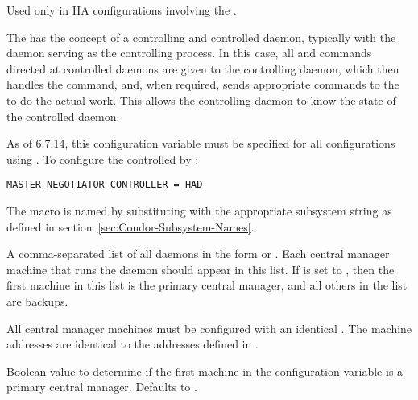 \begin{description}
\label{param:MasterSubsysController}
\item[\Macro{MASTER\_<SUBSYS>\_CONTROLLER}]
  Used only in HA configurations involving the .

  The  has the concept of a controlling and controlled
  daemon, typically
  with the  daemon serving as the controlling process.
  In this case, all  and  commands directed
  at controlled daemons are given to the controlling daemon, which
  then handles the command, and, when required, sends appropriate
  commands to the  to do the actual work.  This allows
  the controlling daemon to know the state of the controlled daemon.

  As of 6.7.14, this configuration variable must be specified for all
  configurations using .
  To configure the  controlled by :

\begin{verbatim}
MASTER_NEGOTIATOR_CONTROLLER = HAD
\end{verbatim}

  The macro is named by substituting 
  with the appropriate subsystem string as defined in
  section~\ref{sec:Condor-Subsystem-Names}.


\label{param:HADList}
\item[\Macro{HAD\_LIST}]
  A comma-separated list of all  daemons
  in the form  or .
  Each central manager machine that runs the  daemon
  should appear in this list.
  If  is set to ,
  then the first machine in this list is the primary central
  manager, and all others in the list are backups.

  All central manager machines must be configured with 
  an identical .
  The machine addresses are identical to the addresses defined
  in .

%
%
%
%

\label{param:HADUsePrimary}
\item[\Macro{HAD\_USE\_PRIMARY}]
  Boolean value to determine if the first machine in the 
   configuration variable is
  a primary central manager.
  Defaults to .


\end{description}
